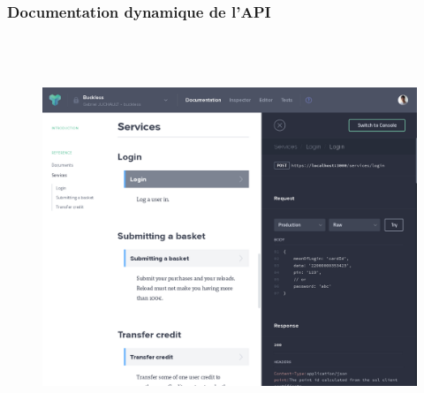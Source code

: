     \newpage
    \subsubsection{Documentation dynamique de l'API}
        \begin{figure}[h]
            \centering
            \includegraphics[height=12cm]{./assets/apiary.png}
        \end{figure}